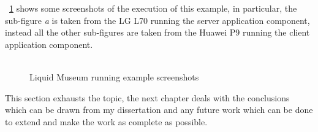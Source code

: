 \figurename~\ref{fig:5.12} shows some screenshots of the execution of this example, in particular, the sub-figure \textit{a} is taken from the LG L70 running the server application component, instead all the other sub-figures are taken from the Huawei P9 running the client application component. \\\\
\begin{figure}[ht!]
	\centering
	\begin{minipage}{.24\textwidth}\centering
	\end{minipage}
	\begin{minipage}{.24\textwidth}\centering
	\end{minipage}
	\centering
	\begin{minipage}{.24\textwidth}\centering
	\end{minipage}
	\begin{minipage}{.24\textwidth}\centering
	\end{minipage}
	\caption{Liquid Museum running example screenshots}
	\label{fig:5.12}
\end{figure}

\bigskip
\bigskip
\bigskip
\bigskip
\par This section exhausts the topic, the next chapter deals with the conclusions which can be drawn from my dissertation and any future work which can be done to extend and make the work as complete as possible.